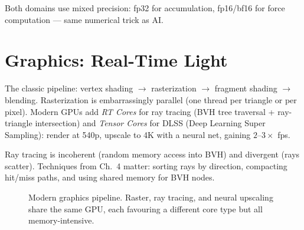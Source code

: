 Both domains use mixed precision: fp32 for accumulation, fp16/bf16 for force computation --- same numerical trick as AI.

\section{Graphics: Real-Time Light}
The classic pipeline: vertex shading $\to$ rasterization $\to$ fragment shading $\to$ blending. Rasterization is embarrassingly parallel (one thread per triangle or per pixel). Modern GPUs add \emph{RT Cores} for ray tracing (BVH tree traversal + ray-triangle intersection) and \emph{Tensor Cores} for DLSS (Deep Learning Super Sampling): render at 540p, upscale to 4K with a neural net, gaining $2$--$3\times$ fps.

Ray tracing is incoherent (random memory access into BVH) and divergent (rays scatter). Techniques from Ch.~4 matter: sorting rays by direction, compacting hit/miss paths, and using shared memory for BVH nodes.

\begin{figure}[h]\centering
{}
\caption{Modern graphics pipeline. Raster, ray tracing, and neural upscaling share the same GPU, each favouring a different core type but all memory-intensive.}
\label{fig:graphics-pipe}
\end{figure}

